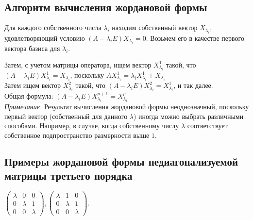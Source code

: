 \documentclass[12pt]{article}
\begin{document}
\subsection{Алгоритм вычисления жордановой формы}
Для каждого собственного числа \(\lambda_i\) находим собственный вектор \(X_{\lambda_i}\), удовлетворяющий условию \((A - \lambda_iE)X_{\lambda_i} = 0\). Возьмем его в качестве первого вектора базиса для \(\lambda_i\).

Затем, с учетом матрицы оператора, ищем вектор \(X_{\lambda_i}^1\) такой, что \((A - \lambda_iE)X_{\lambda_i}^1 = X_{\lambda_i}\), поскольку \(AX_{\lambda_i}^1 = \lambda_iX_{\lambda_i}^1 + X_{\lambda_i}\)\\
Затем ищем вектор \(X_{\lambda_i}^2\) такой, что \((A - \lambda_iE)X_{\lambda_i}^2 = X_{\lambda_i}^1\), и так далее.\\
Общая формула: \((A - \lambda_iE)X_{\lambda_i}^{p+1} = X_{\lambda_i}^p\)\\

\textit{Примечание.} Результат вычисления жордановой формы неоднозначный, поскольку первый вектор (собственный для данного $\lambda$) иногда можно выбрать различными способами. Например, в случае, когда собственному числу $\lambda$ соответствует собственное подпространство размерности выше $1$.

\subsection{Примеры жордановой формы недиагонализуемой матрицы третьего порядка}
$
    \begin{pmatrix}
        \lambda & 0       & 0       \\
        0       & \lambda & 1       \\
        0       & 0       & \lambda
    \end{pmatrix},
    \begin{pmatrix}
        \lambda & 1       & 0       \\
        0       & \lambda & 1       \\
        0       & 0       & \lambda
    \end{pmatrix}$.
\end{document}
